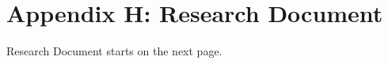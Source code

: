 \chapter*{Appendix H: Research Document}
\label{chap:appendix-H-research-doc}

Research Document starts on the next page.
